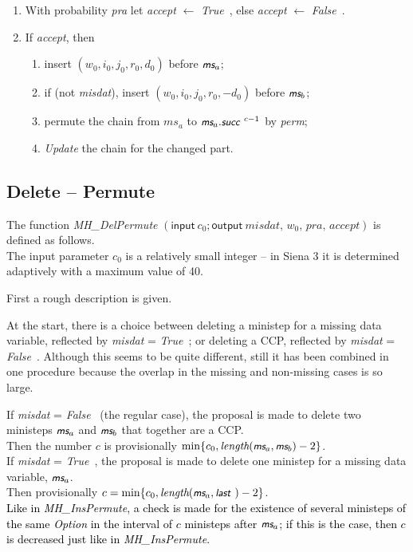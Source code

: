 \documentclass[a4paper,12pt,fleqn]{article}
\newcommand{\nnm}[1]{\textsf{\small\textit{#1}\ }}
\newcommand{\ms}{\textsl{\textsf{\small ms}}} %
\newcommand{\addce}[1]{{\textcolor[named]{Black}{#1}}}
\begin{document}
\begin{enumerate}[resume]
\item With probability \textit{pra} let \textit{accept} $\leftarrow$ \nnm{True}, else
      \textit{accept} $\leftarrow$ \nnm{False}.
\item If \textit{accept}, then
       \begin{enumerate}
       \item insert $(w_0,i_0,j_0,r_0,d_0)$ before $\ms_a$;
       \item if (not \textit{misdat}), insert $(w_0,i_0,j_0,r_0,-d_0)$ before $\ms_b$;
       \item permute the chain from $ms_a$ to $\ms_a.\nnm{succ}^{c-1}$ by \textit{perm};
       \item  \textit{Update} the chain for the changed part.
       \end{enumerate}
\end{enumerate}

\subsection{Delete -- Permute}
\label{S_delper}

The function
\textit{MH\_DelPermute}
$(\textsf{input}\ c_0;%
   \textsf{output}\ \textit{misdat, $w_0$, pra, accept})$
is defined as follows.\\
The input parameter $c_0$ is a relatively small integer --
in Siena 3 it is determined adaptively with a maximum value of 40.

First a rough description is given.

At the start, there is a choice between deleting a ministep
for a missing data variable, reflected by \textit{misdat} = \nnm{True}; or deleting a CCP,
reflected by \textit{misdat} = \nnm{False}.
Although this seems to be quite different, still it has been
combined in one procedure because the overlap in the
missing and non-missing cases is so large.

If \textit{misdat} = \nnm{False} (the regular case),
the proposal is made to delete two ministeps
$\ms_a$ and $\ms_b$ that together are a CCP.\\
Then the number $c$ is provisionally $\min\{c_0, \textit{length}(\ms_a,\ms_b)-2\}$.
\\
If \textit{misdat} = \nnm{True},
the proposal is made to delete one ministep
for a missing data variable, $\ms_a$.\\
Then provisionally $c = \min\{c_0, \textit{length}(\ms_a,\nnm{last})-2\}$.\\
\addce{Like in \textit{MH\_InsPermute}, a check is made for the
existence of several ministeps of the same \textit{Option} in the
interval of $c$ ministeps after $\ms_a$; if this is the case,
then $c$ is decreased just like in  \textit{MH\_InsPermute}.}
\end{document}
